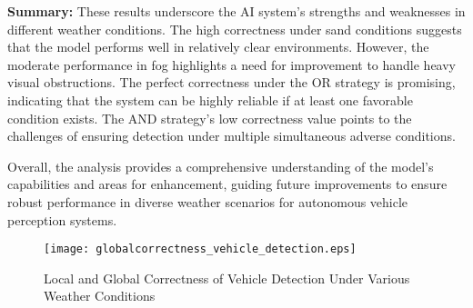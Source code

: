 \textbf{Summary:} These results underscore the AI system's strengths and weaknesses in different weather conditions. The high correctness under sand conditions suggests that the model performs well in relatively clear environments. However, the moderate performance in fog highlights a need for improvement to handle heavy visual obstructions. The perfect correctness under the OR strategy is promising, indicating that the system can be highly reliable if at least one favorable condition exists. The AND strategy's low correctness value points to the challenges of ensuring detection under multiple simultaneous adverse conditions.

Overall, the analysis provides a comprehensive understanding of the model's capabilities and areas for enhancement, guiding future improvements to ensure robust performance in diverse weather scenarios for autonomous vehicle perception systems.

\begin{figure}[h]
    \centering
    \texttt{[image: globalcorrectness\_vehicle\_detection.eps]}
    \caption{Local and Global Correctness of Vehicle Detection Under Various Weather Conditions}
    \label{fig:global_correctness_vehicle_detection}
\end{figure}





\newpage


